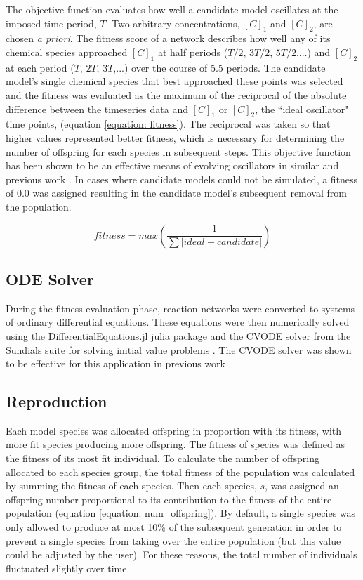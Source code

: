 \documentclass[12pt]{report}
\begin{document}
The objective function evaluates how well a candidate model oscillates at the imposed time period, $T$.  Two arbitrary concentrations, $[C]_{1}$ and $[C]_{2}$,  are chosen \textit{a priori}. The fitness score of a network describes how well any of its chemical species approached $[C]_{1}$ at half periods ($T/2$, $3T/2$, $5T/2$,...) and  $[C]_{2}$ at each period ($T$, $2T$, $3T$,...) over the course of 5.5 periods. The candidate model's single chemical species that best approached these points was selected and the fitness was evaluated as the maximum of the reciprocal of the absolute difference between the timeseries data and $[C]_{1}$ or $[C]_{2}$, the ``ideal oscillator" time points, (equation \ref{equation: fitness}). The reciprocal was taken so that higher values represented better fitness, which is necessary for determining the number of offspring for each species in subsequent steps. This objective function has been shown to be an effective means of evolving oscillators in similar and previous work \cite{Paladugu2006, francois_hakim_2004, Tatka2023}. In cases where candidate models could not be simulated, a fitness of 0.0 was assigned resulting in the candidate model's subsequent removal from the population.

\begin{equation}
\label{equation: fitness}
fitness = max(\frac{1}{\sum|ideal - candidate|})
\end{equation}

\subsection{ODE Solver}
During the fitness evaluation phase, reaction networks were converted to systems of ordinary differential equations. These equations were then numerically solved using the DifferentialEquations.jl julia package \cite{DifferentialEquations.jl-2017} and the CVODE solver from the Sundials suite for solving initial value problems \cite{hindmarsh2005sundials}. The CVODE solver was shown to be effective for this application in previous work \cite{Tatka2023}.

\subsection{Reproduction}

Each model species was allocated offspring in proportion with its fitness, with more fit species producing more offspring. The fitness of species was defined as the fitness of its most fit individual. To calculate the number of offspring allocated to each species group, the total fitness of the population was calculated by summing the fitness of each species. Then each species, $s$, was assigned an offspring number proportional to its contribution to the fitness of the entire population (equation \ref{equation: num_offspring}). By default, a single species was only allowed to produce at most 10\% of the subsequent generation in order to prevent a single species from taking over the entire population (but this value could be adjusted by the user). For these reasons, the total number of individuals fluctuated slightly over time.
\end{document}
